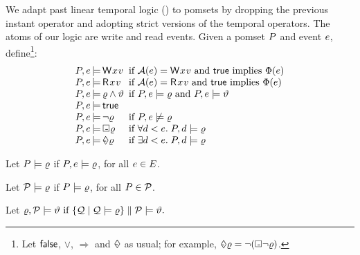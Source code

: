 We adapt past linear temporal logic (\pLTL)
\cite{Lichtenstein:1985:GP:648065.747612} to pomsets by dropping the previous
instant operator and adopting strict versions of the temporal operators.
The atoms of our logic are write and read events.
Given a pomset $P$ and event $e$, define\footnote{Let $\mathsf{false}$, $\lor$,
  $\Rightarrow$ and $\Diamond\mkern-10.1mu\text{-}\mkern4mu$ as usual;
  for example,
  $\Diamond\mkern-10.1mu\text{-}\mkern4mu\varrho = \lnot(\Box\mkern-8.8mu\text{-}\mkern3mu\lnot\varrho)$.}:
\begin{displaymath}
  \renewcommand{\arraycolsep}{.2ex}
    \begin{array}{lrll}
      \aPS,\aEv &\models& \DW{\aLoc}{\aVal} &\text{ if } \labelingAct(\aEv) = \DW{\aLoc}{\aVal} \text{ and } \TRUE \text{ implies } \labelingForm(\aEv) \\
      \aPS,\aEv &\models& \DR{\aLoc}{\aVal} &\text{ if } \labelingAct(\aEv) = \DR{\aLoc}{\aVal} \text{ and } \TRUE \text{ implies } \labelingForm(\aEv) \\
      \aPS,\aEv &\models& \afo\land\bfo &\text{ if } \aPS,\aEv \models  \afo \text{ and } \aPS,\aEv \models  \bfo \\
      \aPS,\aEv &\models& \TRUE\\
      \aPS,\aEv &\models& \lnot\afo &\text{ if } \aPS,\aEv \not\models \afo \\
      \aPS,\aEv &\models& \always\afo &\text{ if } \forall \bEv \lt \aEv.\; \aPS,\bEv \models \afo\\
      \aPS,\aEv &\models& \once\afo &\text{ if } \exists \bEv \lt \aEv.\;  \aPS,\bEv \models \afo 
    \end{array} 
  \end{displaymath}

  Let $P \models \varrho$ if
  $P,e \models\varrho$, for all $e \in E$.

  Let $\mathcal{P}\models \varrho$
  if $P \models\varrho$, for all $P \in \mathcal{P}$.
  
Let
  \begin{math}
    \varrho, \mathcal{P} \models \vartheta  \text{ if } \{ \mathcal{Q} \mid \mathcal{Q} \models \varrho \} \parallel \mathcal{P} \models \vartheta.
  \end{math}

